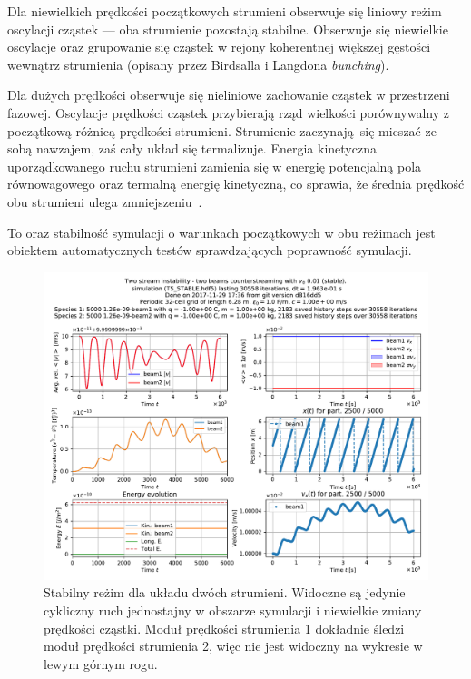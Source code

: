     Dla niewielkich prędkości początkowych strumieni obserwuje się
    liniowy reżim oscylacji cząstek --- oba strumienie pozostają stabilne. Obserwuje się niewielkie oscylacje oraz
grupowanie się cząstek w rejony koherentnej większej gęstości wewnątrz strumienia (opisany przez Birdsalla i Langdona \emph{bunching}).

    Dla dużych prędkości obserwuje się nieliniowe
    zachowanie cząstek w przestrzeni fazowej. Oscylacje prędkości cząstek przybierają rząd wielkości porównywalny
    z początkową różnicą prędkości strumieni.
 Strumienie zaczynają się mieszać ze sobą nawzajem, zaś cały układ się termalizuje. Energia kinetyczna
 uporządkowanego ruchu strumieni zamienia się w energię potencjalną pola równowagowego 
oraz termalną energię kinetyczną, co sprawia, że średnia prędkość obu strumieni ulega zmniejszeniu~\cite{birdsall}.

To oraz stabilność symulacji o warunkach początkowych w obu reżimach jest
obiektem automatycznych testów sprawdzających poprawność symulacji.

\begin{figure}[h!]
  \includegraphics[width=\textwidth]{Images/TS_STABLE}
  \caption{Stabilny reżim dla układu dwóch strumieni. Widoczne są jedynie
  cykliczny ruch jednostajny w obszarze symulacji i niewielkie zmiany prędkości
cząstki. Moduł prędkości strumienia 1 dokładnie śledzi moduł prędkości
strumienia 2, więc nie jest widoczny na wykresie w lewym górnym
rogu.\label{fig:twostream-stable}}
\end{figure}

